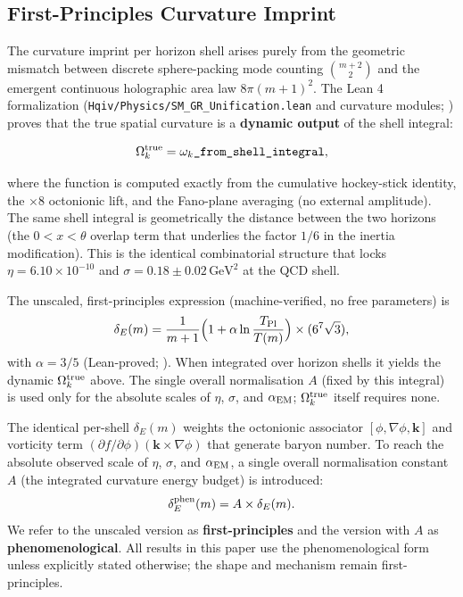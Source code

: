 \documentclass[12pt,a4paper]{article}
\begin{document}
\subsection{First-Principles Curvature Imprint}
\label{sec:curvature}
The curvature imprint per horizon shell arises purely from the geometric mismatch between discrete sphere-packing mode counting \(\binom{m+2}{2}\) and the emergent continuous holographic area law \(8\pi (m+1)^2\). The Lean 4 formalization (\texttt{Hqiv/Physics/SM\_GR\_Unification.lean} and curvature modules; \citep{hqiv-lean}) proves that the true spatial curvature is a \textbf{dynamic output} of the shell integral:

\[
\Omega_k^{\rm true} = \omega_k\texttt{\_from\_shell\_integral},
\]

where the function is computed exactly from the cumulative hockey-stick identity, the \(\times 8\) octonionic lift, and the Fano-plane averaging (no external amplitude). The same shell integral is geometrically the distance between the two horizons (the \(0 < x < \theta\) overlap term that underlies the factor \(1/6\) in the inertia modification). This is the identical combinatorial structure that locks \(\eta = 6.10 \times 10^{-10}\) and \(\sigma = 0.18 \pm 0.02\,\text{GeV}^2\) at the QCD shell.

The unscaled, first-principles expression (machine-verified, no free parameters) is
\[
\delta_E(m) = \frac{1}{m+1} \Bigl(1 + \alpha \ln\frac{T_{\rm Pl}}{T(m)}\Bigr) \times (6^7\sqrt{3}),
\]
with \(\alpha = 3/5\) (Lean-proved; \citep{hqiv-lean}). When integrated over horizon shells it yields the dynamic \(\Omega_k^{\rm true}\) above. The single overall normalisation \(A\) (fixed by this integral) is used only for the absolute scales of \(\eta\), \(\sigma\), and \(\alpha_{\rm EM}\); \(\Omega_k^{\rm true}\) itself requires none.

The identical per-shell \(\delta_E(m)\) weights the octonionic associator \([\phi,\nabla\phi,\mathbf{k}]\) and vorticity term \((\partial f/\partial\phi)(\mathbf{k}\times\nabla\phi)\) that generate baryon number. To reach the absolute observed scale of \(\eta\), \(\sigma\), and \(\alpha_{\rm EM}\), a single overall normalisation constant \(A\) (the integrated curvature energy budget) is introduced:
\[
\delta_E^{\rm phen}(m) = A \times \delta_E(m).
\]
We refer to the unscaled version as \textbf{first-principles} and the version with \(A\) as \textbf{phenomenological}. All results in this paper use the phenomenological form unless explicitly stated otherwise; the shape and mechanism remain first-principles.
\end{document}
